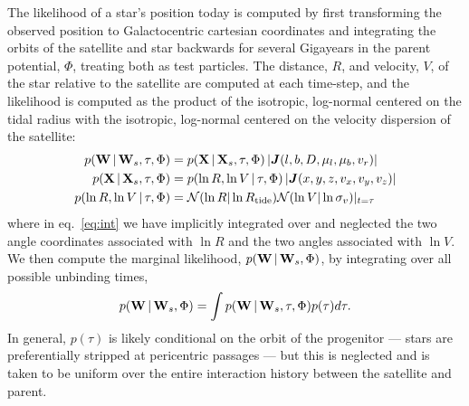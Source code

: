 \documentclass[letterpaper,12pt,preprint]{aastex}
\newcommand{\given}{\,|\,}
\newcommand{\jac}[1]{\left\vert \J{#1} \right\vert}
\newcommand{\D}{{\bf D}}
\newcommand{\W}{{\bf W}}
\newcommand{\X}{{\bf X}}
\newcommand{\J}{{\boldsymbol J}}
\newcommand{\rtide}{R_{\rm tide}}
\begin{document}
The likelihood of a star's position today is computed by first transforming the observed position to Galactocentric cartesian coordinates and integrating the orbits of the satellite and star backwards for several Gigayears in the parent potential, $\Phi$, treating both as test particles. The distance, $R$, and velocity, $V$, of the star relative to the satellite are computed at each time-step, and the likelihood is computed as the product of the isotropic, log-normal centered on the tidal radius with the isotropic, log-normal centered on the velocity dispersion of the satellite:
\begin{align}
	p(\W \given \W_s, \tau, \Phi) &= p(\X \given \X_s, \tau, \Phi) \jac{(l,b,D,\mu_l,\mu_b,v_r)}\\
	p(\X \given \X_s, \tau, \Phi) &= p(\ln R, \ln V \given \tau, \Phi) \jac{(x,y,z,v_x,v_y,v_z)}\label{eq:int} \\
	p(\ln R, \ln V \given \tau, \Phi) &= \mathcal{N}(\ln R | \ln \rtide)\mathcal{N}(\ln V | \ln \sigma_v)\vert_{t=\tau}
\end{align}
where in eq.~\ref{eq:int} we have implicitly integrated over and neglected the two angle coordinates associated with $\ln R$ and the two angles associated with $\ln V$. We then compute the marginal likelihood, $p(\W \given \W_s, \Phi)$, by integrating over all possible unbinding times,
\begin{align}
	p(\W \given \W_s, \Phi) = \int p(\W \given \W_s, \tau, \Phi)p(\tau) d\tau.
\end{align}
In general, $p(\tau)$ is likely conditional on the orbit of the progenitor --- stars are preferentially stripped at pericentric passages --- but this is neglected and is taken to be uniform over the entire interaction history between the satellite and parent. 
\end{document}

